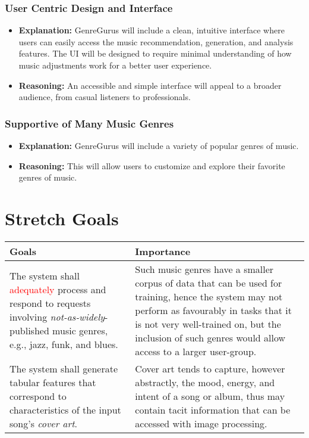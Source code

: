 \documentclass{article}
\begin{document}
\subsubsection*{User Centric Design and Interface}
\begin{itemize}
    \item \textbf{Explanation:} GenreGurus will include a clean, intuitive interface where users can easily access the music recommendation, generation, and analysis features. The UI will be designed to require minimal understanding of how music adjustments work for a better user experience.
    \item \textbf{Reasoning:} An accessible and simple interface will appeal to a broader audience, from casual listeners to professionals.
\end{itemize}

\subsubsection*{Supportive of Many Music Genres}
\begin{itemize}
    \item \textbf{Explanation:} GenreGurus will include a variety of popular genres of music.
    \item \textbf{Reasoning:} This will allow users to customize and explore their favorite genres of music.
\end{itemize}


\section{Stretch Goals}
\begin{table}[h]
    \centering
    \begin{tabular}{|| p{} | p{} ||}
        \hline
        \textbf{Goals} & \textbf{Importance} \\
        \hline
        The system shall \textcolor{red}{adequately} process and respond to 
        requests involving \emph{not-as-widely}-published music genres, e.g., 
        jazz, funk, and blues. & Such music genres have a smaller corpus of 
        data that can be used for training, hence the system may not perform 
        as favourably in tasks that it is not very well-trained on, but the 
        inclusion of such genres would allow access to a larger user-group. \\
        \hline
        The system shall generate tabular features that correspond to 
        characteristics of the input song's \emph{cover art}. & Cover art tends 
        to capture, however abstractly, the mood, energy, and intent of a song 
        or album, thus may contain tacit information that can be accessed with 
        image processing. \\
        \hline
    \end{tabular}
\end{table}
\end{document}

